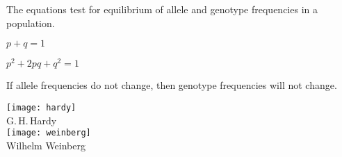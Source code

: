 \documentclass[t]{beamer}
\begin{document}
% 
\begin{frame}[t]{The  equations test for equilibrium of allele and genotype frequencies in a population.}

	\vspace*{-\baselineskip}
	
	\begin{multicols}{2}
	
	\vspace*{0\baselineskip}
	
	\hangpara $p + q = 1$
	
	\hangpara $p^2 + 2pq + q^2 = 1$
	
	\vspace{\baselineskip}
	
	\hangpara If allele frequencies do not change, then genotype frequencies will not change.
	
	\vspace{\baselineskip}
	
	\hangpara {}
	
	\columnbreak
	
		{\centering \texttt{[image: hardy]}\\[-1ex]
		{\small G.\,H.\,Hardy}\\[1ex]

		\texttt{[image: weinberg]}\\[-1ex]
		{\small Wilhelm Weinberg}\par
		}
		
	\end{multicols}
	
\end{frame}
\end{document}
